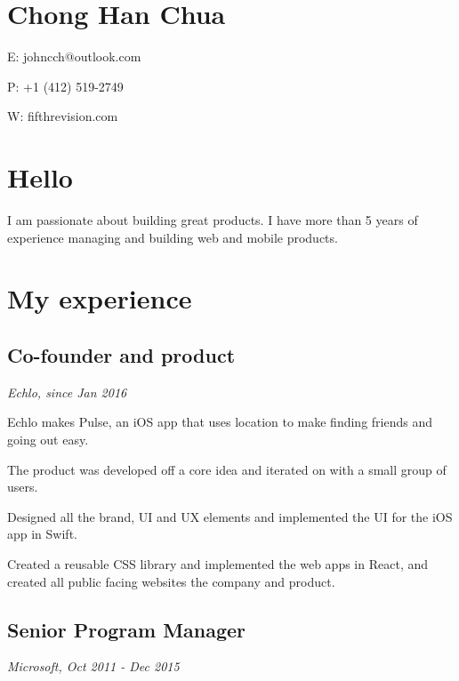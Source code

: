 \section[chong-han-chua]{Chong Han Chua}

\startitemize[packed]
\item
  E: johncch@outlook.com
\item
  P: +1 (412) 519-2749
\item
  W: fifthrevision.com
\stopitemize

\section[hello]{Hello}

I am passionate about building great products. I have more than 5 years
of experience managing and building web and mobile products.

\section[my-experience]{My experience}

\subsection[co-founder-and-product]{Co-founder and product}

{\em Echlo, since Jan 2016}

\startitemize[packed]
\item
  Echlo makes Pulse, an iOS app that uses location to make finding
  friends and going out easy.
\item
  The product was developed off a core idea and iterated on with a small
  group of users.
\item
  Designed all the brand, UI and UX elements and implemented the UI for
  the iOS app in Swift.
\item
  Created a reusable CSS library and implemented the web apps in React,
  and created all public facing websites the company and product.
\stopitemize

\subsection[senior-program-manager]{Senior Program Manager}

{\em Microsoft, Oct 2011 - Dec 2015}

